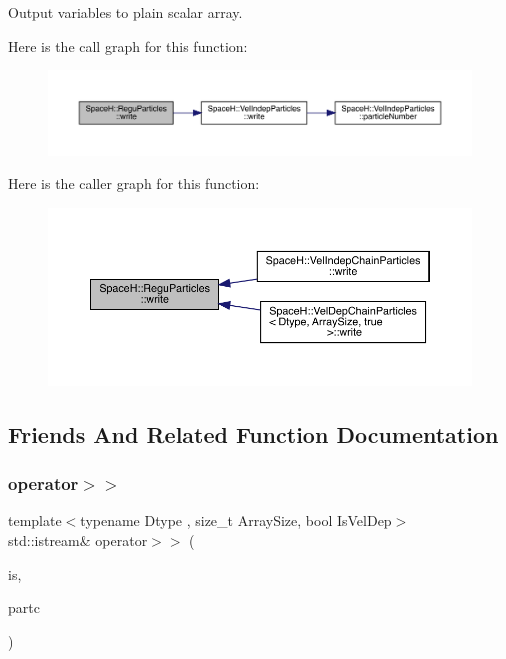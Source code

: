 Output variables to plain scalar array. 

Here is the call graph for this function\+:
\nopagebreak
\begin{figure}[H]
\begin{center}
\leavevmode
\includegraphics[width=350pt]{class_space_h_1_1_regu_particles_a5e6f99ab289e48790db7599fac59aa5a_cgraph}
\end{center}
\end{figure}
Here is the caller graph for this function\+:
\nopagebreak
\begin{figure}[H]
\begin{center}
\leavevmode
\includegraphics[width=350pt]{class_space_h_1_1_regu_particles_a5e6f99ab289e48790db7599fac59aa5a_icgraph}
\end{center}
\end{figure}


\subsection{Friends And Related Function Documentation}
\mbox{\label{class_space_h_1_1_regu_particles_a9a189bff31e696428cec5810b545f050}} 
\subsubsection{\texorpdfstring{operator$>$$>$}{operator>>}}
{\footnotesize\ttfamily template$<$typename Dtype , size\+\_\+t Array\+Size, bool Is\+Vel\+Dep$>$ \\
std\+::istream\& operator$>$$>$ (\begin{DoxyParamCaption}\item[{std\+::istream \&}]{is,  }\item[{\mbox{\hyperlink{class_space_h_1_1_regu_particles}{Regu\+Particles}}$<$ Dtype, Array\+Size, Is\+Vel\+Dep $>$ \&}]{partc }\end{DoxyParamCaption})\hspace{0.3cm}{\ttfamily [friend]}}



